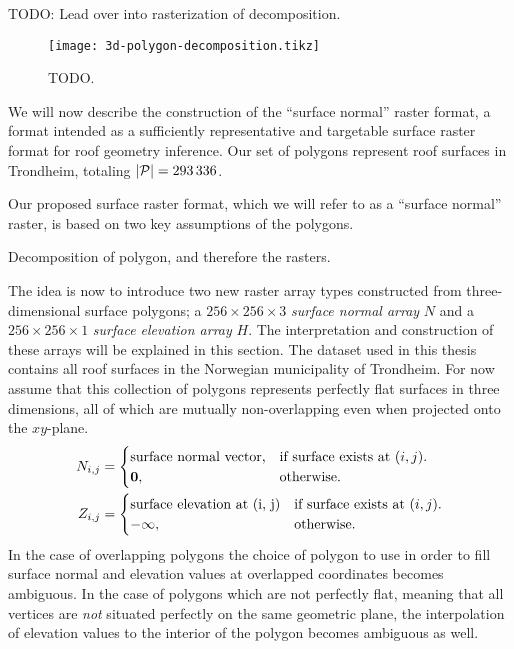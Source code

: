 TODO: Lead over into rasterization of decomposition.
\begin{figure}
  \centering
  \texttt{[image: 3d-polygon-decomposition.tikz]}
  \caption{TODO.}
  \label{fig:3d-polygon-decomposition}
\end{figure}

We will now describe the construction of the \enquote{surface normal} raster format, a format intended as a sufficiently representative and targetable surface raster format for roof geometry inference.
Our set of polygons represent roof surfaces in Trondheim, totaling $|\mathcal{P}| = \num{293336}$.

Our proposed surface raster format, which we will refer to as a \enquote{surface normal} raster, is based on two key assumptions of the polygons.



Decomposition of polygon, and therefore the rasters.

The idea is now to introduce two new raster array types constructed from three-dimensional surface polygons; a $256 \times 256 \times 3$ \textit{surface normal array} $N$ and a $256 \times 256 \times 1$ \textit{surface elevation array} $H$.
The interpretation and construction of these arrays will be explained in this section.
The dataset used in this thesis contains all roof surfaces in the Norwegian municipality of Trondheim.
For now assume that this collection of polygons represents perfectly flat surfaces in three dimensions, all of which are mutually non-overlapping even when projected onto the $xy$-plane.
%
\begin{align*}
  N_{i,j} &= \begin{cases}
    \text{surface normal vector,} &\text{if surface exists at } (i, j).\\
    \vec{0}, &\text{otherwise.}
  \end{cases}
  \\
  Z_{i,j} &= \begin{cases}
    \text{surface elevation at } $(i, j)$ &\text{if surface exists at } (i, j).\\
    -\infty, &\text{otherwise.}
  \end{cases}
\end{align*}
%
In the case of overlapping polygons the choice of polygon to use in order to fill surface normal and elevation values at overlapped coordinates becomes ambiguous.
In the case of polygons which are not perfectly flat, meaning that all vertices are \emph{not} situated perfectly on the same geometric plane, the interpolation of elevation values to the interior of the polygon becomes ambiguous as well.


